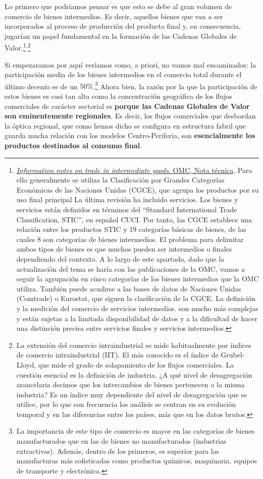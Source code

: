 \documentclass[10pt,a4paper]{article}
\begin{document}
Lo primero que podríamos pensar es que esto se debe al gran volumen de comercio de bienes intermedios. Es decir, aquellos bienes que van a ser incorporados al proceso de producción del producto final y, en consecuencia, jugarían un papel fundamental en la formación de las Cadenas Globales de Valor.\footnote{%
    \href{https://www.wto.org/english/res_e/statis_e/miwi_e/tig_e.htm}{\textit{Information notes on trade in intermediate goods}. OMC, Nota técnica}. Para ello generalmente se utiliza la Clasificación por Grandes Categorías Económicas de las Naciones Unidas (CGCE), que agrupa los productos por su uso final principal La última revisión ha incluido servicios. Los bienes y servicios están definidos en términos del “Standard International Trade Classification, STIC”, en español CUCI. Por tanto, las CGCE establece una relación entre los productos STIC y 19 categorías básicas de bienes, de las cuales 8 son categorías de bienes intermedios. El problema para delimitar ambos tipos de bienes es que muchos pueden ser intermedios o finales dependiendo del contexto. A lo largo de este apartado, dado que la actualización del tema se haría con las publicaciones de la OMC, vamos a seguir la agrupación en cinco categorías de los bienes intermedios que la OMC utiliza. También puede acudirse a las bases de datos de Naciones Unidas (Comtrade) o Eurostat, que siguen la clasificación de la CGCE. La definición y la medición del comercio de servicios intermedios. son mucho más complejas y están sujetas a la limitada disponibilidad de datos y a la dificultad de hacer una distinción precisa entre servicios finales y servicios intermedios.
}\textsuperscript{,}\footnote{%
    La extensión del comercio intraindustrial se mide habitualmente por índices de comercio intraindustrial (IIT). El más conocido es el índice de Grubel-Lloyd, que mide el grado de solapamiento de los flujos comerciales. La cuestión esencial es la definición de industria. ¿A qué nivel de desagregación arancelaria decimos que los intercambios de bienes pertenecen a la misma industria? Es un índice muy dependiente del nivel de desagregación que se utilice, por lo que con frecuencia los análisis se centran en su evolución temporal y en las diferencias entre los países, más que en los datos brutos.
} 

Si empezaramos por aquí veríamos como, a priori, no vamos mal encaminados: la participación media de los bienes intermedios en el comercio total durante el último decenio es de un $50\%$.\footnote{%
    La importancia de este tipo de comercio es mayor en las categorías de bienes manufacturados que en las de bienes no manufacturados (industrias extractivas). Además, dentro de los primeros, es superior para las manufacturas más sofisticadas como productos químicos, maquinaria, equipos de transporte y electrónica.
} Ahora bien, la razón por la que la participación de estos bienes es casi tan alta como la concentración geográfica de los flujos comerciales de carácter sectorial es \textbf{porque las Cadenas Globales de Valor son eminentemente regionales}. Es decir, los flujos comerciales que desbordan la óptica regional, que como hemos dicho se configura en estructura fabril que guarda mucha relación con los modelos Centro-Periferia, son \textbf{esencialmente los productos destinados al consumo final}.
\end{document}
